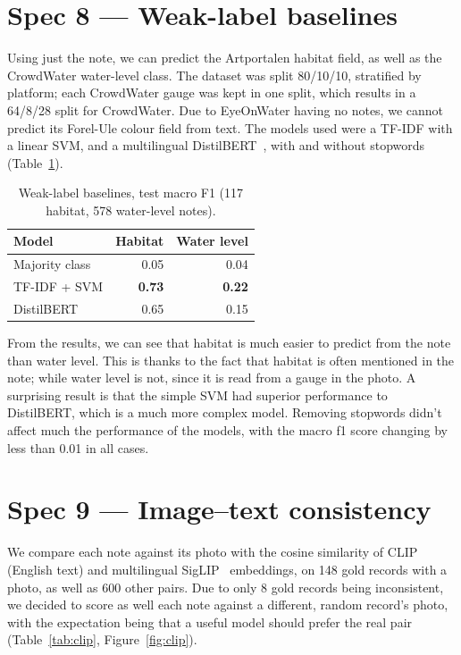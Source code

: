 \section{Spec 8 --- Weak-label baselines}

Using just the note, we can predict the Artportalen habitat field, as well as the CrowdWater water-level class.
The dataset was split 80/10/10, stratified by platform; each CrowdWater gauge was kept in one split, which results in a 64/8/28 split for CrowdWater.
Due to EyeOnWater having no notes, we cannot predict its Forel-Ule colour field from text.
The models used were a TF-IDF with a linear SVM, and a multilingual DistilBERT~\cite{sanh2019distilbert}, with and without stopwords (Table~\ref{tab:weak}). 


\begin{table}[htbp]
\centering\small
\caption{Weak-label baselines, test macro F1 (117 habitat, 578 water-level notes).}
\label{tab:weak}
\begin{tabular}{lrr}
\toprule
Model & Habitat & Water level \\
\midrule
Majority class & 0.05 & 0.04 \\
TF-IDF + SVM & \textbf{0.73} & \textbf{0.22} \\
DistilBERT & 0.65 & 0.15 \\
\bottomrule
\end{tabular}
\end{table}

From the results, we can see that habitat is much easier to predict from the note than water level.
This is thanks to the fact that habitat is often mentioned in the note; while water level is not, since it is read from a gauge in the photo.
A surprising result is that the simple SVM had superior performance to DistilBERT, which is a much more complex model.
Removing stopwords didn't affect much the performance of the models, with the macro f1 score changing by less than 0.01 in all cases.

\section{Spec 9 --- Image--text consistency}

We compare each note against its photo with the cosine similarity of CLIP~\cite{radford2021clip} (English text) and
multilingual SigLIP~\cite{zhai2023siglip} embeddings, on 148 gold records with a photo, as well as 600 other pairs. 
Due to only 8 gold records being inconsistent, we decided to score as well each note against a different, random record's photo, 
with the expectation being that a useful model should prefer the real pair (Table~\ref{tab:clip}, Figure~\ref{fig:clip}).

